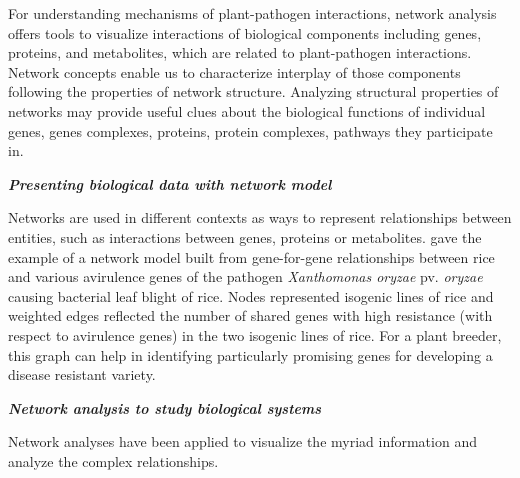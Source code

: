 For understanding mechanisms of plant-pathogen interactions, network analysis offers tools to visualize interactions of biological components including genes, proteins, and metabolites, which are related to plant-pathogen interactions. Network concepts enable us to characterize interplay of those components following the properties of network structure. Analyzing structural properties of networks may provide useful clues about the biological functions of individual genes, genes complexes, proteins, protein complexes, pathways they participate in.

\textit{\textbf{Presenting biological data with network model}}

Networks are used in different contexts as ways to represent relationships between entities, such as interactions between genes, proteins or metabolites. \citet{wu2007gene} gave the example of a network model built from gene-for-gene relationships between rice and various avirulence genes of the pathogen \textit{Xanthomonas oryzae} pv. \textit{oryzae} causing bacterial leaf blight of rice. Nodes represented isogenic lines of rice and weighted edges reflected the number of shared genes with high resistance (with respect to avirulence genes) in the two isogenic lines of rice. For a plant breeder, this graph can help in identifying particularly promising genes for developing a disease resistant variety.


\textit{\textbf{Network analysis to study biological systems}}

Network analyses have been applied to visualize the myriad information and analyze the complex relationships.
